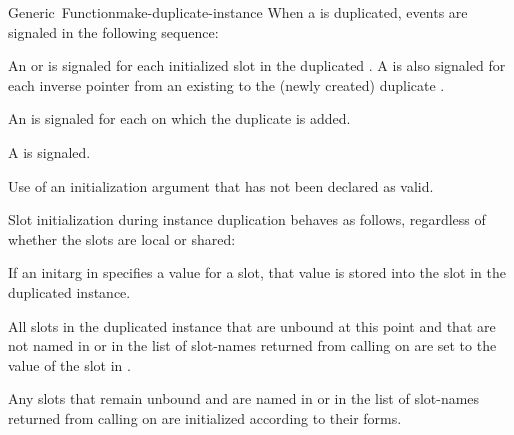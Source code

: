 \documentclass[10pt,twoside,english,pdftex]{article}
\begin{document}
\begin{functiondoc}{Generic~Function}{make-duplicate-instance}{%
    }
\fnevents
{}%
%
%
%
%
%
%
%
%
%
%
%
When a  is duplicated, events are signaled in the
following sequence: 
\begin{tightenumerate}
\item An  or 
  is signaled for each initialized slot in the duplicated
  .  A  is also signaled for each
  inverse pointer from an existing  to the (newly
  created) duplicate .
\item An  is signaled for
  each  on which the duplicate  is
  added.
\item A  is signaled.
\end{tightenumerate}

\fnerrors
%
Use of an initialization argument that has not been declared as valid.

%
%
%
\fndescription 
%
Slot initialization during instance duplication behaves as follows, regardless
of whether the slots are local or shared:
%
\begin{tightitemize}
\item If an initarg in  specifies a value for a slot, that
  value is stored into the slot in the duplicated instance.
\item All slots in the duplicated instance that are unbound at this point and
  that are not named in  or in the list of
  slot-names returned from calling
   on  are
  set to the value of the slot in .
\item Any slots that remain unbound and are named in
   or in the list of slot-names returned from
  calling  on
   are initialized according to their 
  forms.
\end{tightitemize}


\end{functiondoc}
\end{document}

